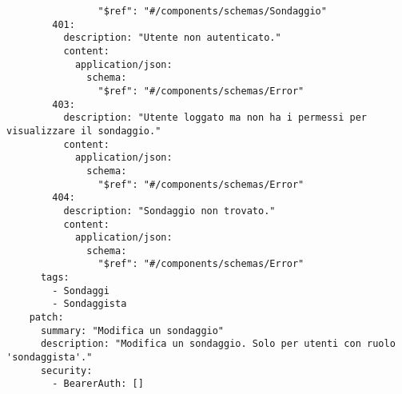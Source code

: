 \begin{verbatim}
                "$ref": "#/components/schemas/Sondaggio"
        401:
          description: "Utente non autenticato."
          content:
            application/json:
              schema:
                "$ref": "#/components/schemas/Error"
        403:
          description: "Utente loggato ma non ha i permessi per visualizzare il sondaggio."
          content:
            application/json:
              schema:
                "$ref": "#/components/schemas/Error"
        404:
          description: "Sondaggio non trovato."
          content:
            application/json:
              schema:
                "$ref": "#/components/schemas/Error"
      tags:
        - Sondaggi
        - Sondaggista
    patch: 
      summary: "Modifica un sondaggio"
      description: "Modifica un sondaggio. Solo per utenti con ruolo 'sondaggista'."
      security:
        - BearerAuth: []
      

\end{verbatim}
